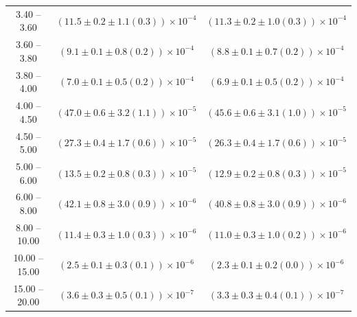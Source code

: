 \begin{table}
\begin{center}
\begin{tabular}{ c | c c }
3.40 -- 3.60 & $(11.5\pm0.2\pm1.1(0.3))\times10^{-4}$ & $(11.3\pm0.2\pm1.0(0.3))\times10^{-4}$ \\ 
3.60 -- 3.80 & $(9.1\pm0.1\pm0.8(0.2))\times10^{-4}$ & $(8.8\pm0.1\pm0.7(0.2))\times10^{-4}$ \\ 
3.80 -- 4.00 & $(7.0\pm0.1\pm0.5(0.2))\times10^{-4}$ & $(6.9\pm0.1\pm0.5(0.2))\times10^{-4}$ \\ 
4.00 -- 4.50 & $(47.0\pm0.6\pm3.2(1.1))\times10^{-5}$ & $(45.6\pm0.6\pm3.1(1.0))\times10^{-5}$ \\ 
4.50 -- 5.00 & $(27.3\pm0.4\pm1.7(0.6))\times10^{-5}$ & $(26.3\pm0.4\pm1.7(0.6))\times10^{-5}$ \\ 
5.00 -- 6.00 & $(13.5\pm0.2\pm0.8(0.3))\times10^{-5}$ & $(12.9\pm0.2\pm0.8(0.3))\times10^{-5}$ \\ 
6.00 -- 8.00 & $(42.1\pm0.8\pm3.0(0.9))\times10^{-6}$ & $(40.8\pm0.8\pm3.0(0.9))\times10^{-6}$ \\ 
8.00 -- 10.00 & $(11.4\pm0.3\pm1.0(0.3))\times10^{-6}$ & $(11.0\pm0.3\pm1.0(0.2))\times10^{-6}$ \\ 
10.00 -- 15.00 & $(2.5\pm0.1\pm0.3(0.1))\times10^{-6}$ & $(2.3\pm0.1\pm0.2(0.0))\times10^{-6}$ \\ 
15.00 -- 20.00 & $(3.6\pm0.3\pm0.5(0.1))\times10^{-7}$ & $(3.3\pm0.3\pm0.4(0.1))\times10^{-7}$ \\ 
\hline
\end{tabular}
\end{center}
\end{table}
 
